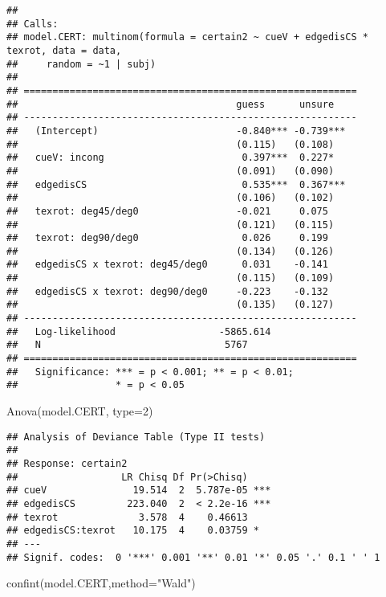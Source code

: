 \documentclass[
]{article}
\newenvironment{Shaded}{\begin{snugshade}}{\end{snugshade}}
\newcommand{\AttributeTok}[1]{\textcolor[rgb]{0.77,0.63,0.00}{#1}}
\newcommand{\DecValTok}[1]{\textcolor[rgb]{0.00,0.00,0.81}{#1}}
\newcommand{\FunctionTok}[1]{\textcolor[rgb]{0.00,0.00,0.00}{#1}}
\newcommand{\NormalTok}[1]{#1}
\newcommand{\StringTok}[1]{\textcolor[rgb]{0.31,0.60,0.02}{#1}}
\begin{document}
\begin{verbatim}
## 
## Calls:
## model.CERT: multinom(formula = certain2 ~ cueV + edgedisCS * texrot, data = data, 
##     random = ~1 | subj)
## 
## ==========================================================
##                                      guess      unsure    
## ----------------------------------------------------------
##   (Intercept)                        -0.840*** -0.739***  
##                                      (0.115)   (0.108)    
##   cueV: incong                        0.397***  0.227*    
##                                      (0.091)   (0.090)    
##   edgedisCS                           0.535***  0.367***  
##                                      (0.106)   (0.102)    
##   texrot: deg45/deg0                 -0.021     0.075     
##                                      (0.121)   (0.115)    
##   texrot: deg90/deg0                  0.026     0.199     
##                                      (0.134)   (0.126)    
##   edgedisCS x texrot: deg45/deg0      0.031    -0.141     
##                                      (0.115)   (0.109)    
##   edgedisCS x texrot: deg90/deg0     -0.223    -0.132     
##                                      (0.135)   (0.127)    
## ----------------------------------------------------------
##   Log-likelihood                  -5865.614               
##   N                                5767                   
## ==========================================================
##   Significance: *** = p < 0.001; ** = p < 0.01;   
##                 * = p < 0.05
\end{verbatim}

\begin{Shaded}
\begin{Highlighting}[]
\FunctionTok{Anova}\NormalTok{(model.CERT, }\AttributeTok{type=}\DecValTok{2}\NormalTok{)}
\end{Highlighting}
\end{Shaded}

\begin{verbatim}
## Analysis of Deviance Table (Type II tests)
## 
## Response: certain2
##                  LR Chisq Df Pr(>Chisq)    
## cueV               19.514  2  5.787e-05 ***
## edgedisCS         223.040  2  < 2.2e-16 ***
## texrot              3.578  4    0.46613    
## edgedisCS:texrot   10.175  4    0.03759 *  
## ---
## Signif. codes:  0 '***' 0.001 '**' 0.01 '*' 0.05 '.' 0.1 ' ' 1
\end{verbatim}

\begin{Shaded}
\begin{Highlighting}[]
\FunctionTok{confint}\NormalTok{(model.CERT,}\AttributeTok{method=}\StringTok{"Wald"}\NormalTok{)}
\end{Highlighting}
\end{Shaded}
\end{document}
